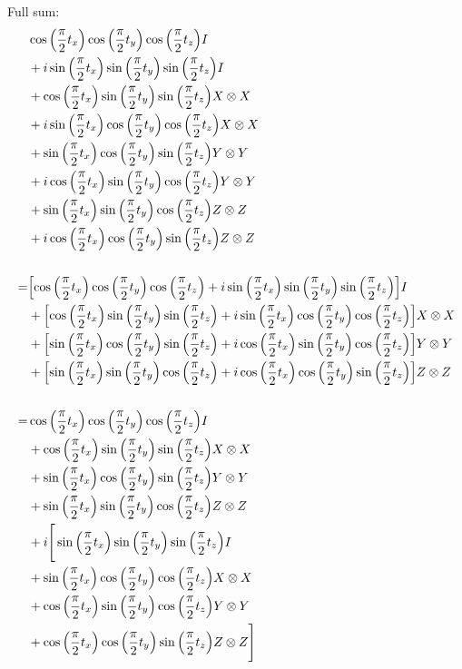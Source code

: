 \documentclass{article}
\begin{document}
Full sum:
\begin{align*}
  & \cos\pqty{\frac{\pi}{2}t_x}\cos\pqty{\frac{\pi}{2}t_y}\cos\pqty{\frac{\pi}{2}t_z} I 
  \\&+ i\sin\pqty{\frac{\pi}{2}t_x}\sin\pqty{\frac{\pi}{2}t_y}\sin\pqty{\frac{\pi}{2}t_z} I
  \\&+ \cos\pqty{\frac{\pi}{2}t_x}\sin\pqty{\frac{\pi}{2}t_y}\sin\pqty{\frac{\pi}{2}t_z} X\otimes X 
  \\&+ i\sin\pqty{\frac{\pi}{2}t_x} \cos\pqty{\frac{\pi}{2}t_y}\cos\pqty{\frac{\pi}{2}t_z} X\otimes X 
  \\&+ \sin\pqty{\frac{\pi}{2}t_x} \cos\pqty{\frac{\pi}{2}t_y} \sin\pqty{\frac{\pi}{2}t_z} Y\otimes Y 
  \\&+ i\cos\pqty{\frac{\pi}{2}t_x}\sin\pqty{\frac{\pi}{2}t_y}\cos\pqty{\frac{\pi}{2}t_z} Y\otimes Y 
  \\&+ \sin\pqty{\frac{\pi}{2}t_x}\sin\pqty{\frac{\pi}{2}t_y}\cos\pqty{\frac{\pi}{2}t_z} Z\otimes Z 
  \\&+ i\cos\pqty{\frac{\pi}{2}t_x}\cos\pqty{\frac{\pi}{2}t_y}\sin\pqty{\frac{\pi}{2}t_z} Z\otimes Z 
  \\
  \\=& \bqty{\cos\pqty{\frac{\pi}{2}t_x}\cos\pqty{\frac{\pi}{2}t_y}\cos\pqty{\frac{\pi}{2}t_z}  
  + i\sin\pqty{\frac{\pi}{2}t_x}\sin\pqty{\frac{\pi}{2}t_y}\sin\pqty{\frac{\pi}{2}t_z}} I
  \\&+ \bqty{\cos\pqty{\frac{\pi}{2}t_x}\sin\pqty{\frac{\pi}{2}t_y}\sin\pqty{\frac{\pi}{2}t_z} 
  + i\sin\pqty{\frac{\pi}{2}t_x} \cos\pqty{\frac{\pi}{2}t_y}\cos\pqty{\frac{\pi}{2}t_z}} X\otimes X 
  \\&+ \bqty{\sin\pqty{\frac{\pi}{2}t_x} \cos\pqty{\frac{\pi}{2}t_y} \sin\pqty{\frac{\pi}{2}t_z} 
  + i\cos\pqty{\frac{\pi}{2}t_x}\sin\pqty{\frac{\pi}{2}t_y}\cos\pqty{\frac{\pi}{2}t_z}} Y\otimes Y 
  \\&+ \bqty{\sin\pqty{\frac{\pi}{2}t_x}\sin\pqty{\frac{\pi}{2}t_y}\cos\pqty{\frac{\pi}{2}t_z}
  + i\cos\pqty{\frac{\pi}{2}t_x}\cos\pqty{\frac{\pi}{2}t_y}\sin\pqty{\frac{\pi}{2}t_z}} Z\otimes Z 
  \\
  \\=& \cos\pqty{\frac{\pi}{2}t_x}\cos\pqty{\frac{\pi}{2}t_y}\cos\pqty{\frac{\pi}{2}t_z} I 
  \\&+ \cos\pqty{\frac{\pi}{2}t_x}\sin\pqty{\frac{\pi}{2}t_y}\sin\pqty{\frac{\pi}{2}t_z} X\otimes X 
  \\&+ \sin\pqty{\frac{\pi}{2}t_x} \cos\pqty{\frac{\pi}{2}t_y} \sin\pqty{\frac{\pi}{2}t_z} Y\otimes Y 
  \\&+ \sin\pqty{\frac{\pi}{2}t_x}\sin\pqty{\frac{\pi}{2}t_y}\cos\pqty{\frac{\pi}{2}t_z} Z\otimes Z 
  \\&+ i\Bigg[\sin\pqty{\frac{\pi}{2}t_x}\sin\pqty{\frac{\pi}{2}t_y}\sin\pqty{\frac{\pi}{2}t_z} I
  \\&+ \sin\pqty{\frac{\pi}{2}t_x} \cos\pqty{\frac{\pi}{2}t_y}\cos\pqty{\frac{\pi}{2}t_z} X\otimes X 
  \\&+ \cos\pqty{\frac{\pi}{2}t_x}\sin\pqty{\frac{\pi}{2}t_y}\cos\pqty{\frac{\pi}{2}t_z} Y\otimes Y 
  \\&+ \cos\pqty{\frac{\pi}{2}t_x}\cos\pqty{\frac{\pi}{2}t_y}\sin\pqty{\frac{\pi}{2}t_z} Z\otimes Z \Bigg]
\end{align*}
\end{document}
